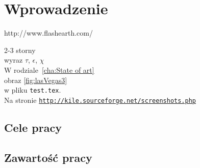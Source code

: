 \chapter{Wprowadzenie}
\label{cha:wprowadzenie}

http://www.flashearth.com/

2-3 storny\\
wyraz $\tau$, $\epsilon$, $\chi$\\
W rodziale~\ref{cha:State of art}\\
obraz \ref{fig:lasVegas3}\\
w pliku \texttt{test.tex}.\\
Na stronie \underline{\texttt{http://kile.sourceforge.net/screenshots.php}}\\

\section{Cele pracy}
\label{sec:celePracy}


\section{Zawartość pracy}
\label{sec:zawartoscPracy}



















